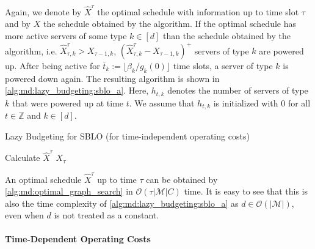 Again, we denote by $\hat{X}^{\tau}$ the optimal schedule with information up to time slot $\tau$ and by $X$ the schedule obtained by the algorithm. If the optimal schedule has more active servers of some type $k \in [d]$ than the schedule obtained by the algorithm, i.e. $\hat{X}_{\tau,k}^{\tau} > X_{\tau-1,k}$, $(\hat{X}_{\tau,k}^{\tau} - X_{\tau-1,k})^+$ servers of type $k$ are powered up. After being active for $\bar{t}_k := \lfloor \beta_k / g_k(0) \rfloor$ time slots, a server of type $k$ is powered down again. The resulting algorithm is shown in \autoref{alg:md:lazy_budgeting:sblo_a}. Here, $h_{t,k}$ denotes the number of servers of type $k$ that were powered up at time $t$. We assume that $h_{t,k}$ is initialized with $0$ for all $t \in \mathbb{Z}$ and $k \in [d]$.

\begin{algorithm}
    \caption{Lazy Budgeting for SBLO (for time-independent operating costs) \cite{Albers2021_2}}\label{alg:md:lazy_budgeting:sblo_a}
    Calculate $\hat{X}^{\tau}$\;
    \Return $X_{\tau}$\;
\end{algorithm}

An optimal schedule $\hat{X}^{\tau}$ up to time $\tau$ can be obtained by \autoref{alg:md:optimal_graph_search} in $\mathcal{O}(\tau |\mathcal{M}| C)$ time. It is easy to see that this is also the time complexity of \autoref{alg:md:lazy_budgeting:sblo_a} as $d \in \mathcal{O}(|\mathcal{M}|)$, even when $d$ is not treated as a constant.

\paragraph{Time-Dependent Operating Costs}

